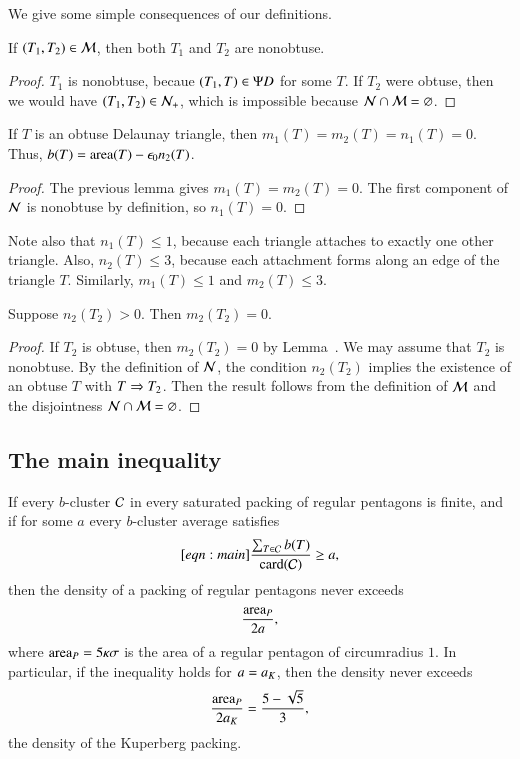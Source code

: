 We give  some simple consequences of our definitions.

\begin{lemma} If $(T_1,T_2)\in \mathcal M$, then both $T_1$ and $T_2$ are nonobtuse.
\end{lemma}

\begin{proof}  $T_1$ is nonobtuse, becaue $(T_1,T)\in\Psi D$ for some $T$.
If $T_2$ were obtuse, then we would have $(T_1,T_2)\in \mathcal N_+$, which is impossible
because $\mathcal N\cap \mathcal M = \varnothing$.
\end{proof}

\begin{lemma}[obtuse $b$]  If $T$ is an obtuse Delaunay triangle, then $m_1(T)=m_2(T)=n_1(T)=0$.
Thus, $b(T) = {\operatorname{area}}(T) - \epsilon_0 n_2(T)$.
\end{lemma}

\begin{proof}  The previous lemma gives $m_1(T)=m_2(T)=0$.  The first component of
$\mathcal N$ is nonobtuse by definition, so $n_1(T)=0$.
\end{proof}

\begin{remark}
  Note also that $n_1(T)\le 1$, because each triangle attaches to
  exactly one other triangle.  Also, $n_2(T)\le 3$, because each
  attachment forms along an edge of the triangle $T$.  Similarly,
  $m_1(T)\le 1$ and $m_2(T)\le 3$.
\end{remark}

\begin{lemma}\label{lemma:n2m2}  Suppose $n_2(T_2)>0$.  Then $m_2(T_2)=0$.
\end{lemma}

\begin{proof} If $T_2$ is obtuse, then $m_2(T_2)=0$ by Lemma~.
We may assume that $T_2$ is nonobtuse.
By the definition of $\mathcal N$, the condition $n_2(T_2)$ implies the existence of an obtuse $T$ with $T\Rightarrow T_2$.
Then the result follows from the definition of $\mathcal M$ and the disjointness $\mathcal N\cap\mathcal M = \varnothing$.
\end{proof}



\subsection{The main inequality}

\begin{lemma}  
If  every $b$-cluster $\mathcal C$ in every saturated packing of regular
  pentagons is finite, and if for some $a$ every $b$-cluster average
  satisfies
\begin{equation}\libel{eqn:main}
\frac{\sum_{T\in \C} b(T)}{\card(\C)} \ge a,
\end{equation}
then the density of a packing of regular pentagons never exceeds 
\[
\frac{{\operatorname{area}}_P} {2 a},
\]
where ${\operatorname{area}}_P = 5\kappa\sigma$ is the area of a regular pentagon of
circumradius $1$.  In particular, if the inequality holds for $a=a_K$,
then the density never exceeds
\[
\frac{{\operatorname{area}}_P}{2 a_K} = \frac{5 - \sqrt{5}}{3},
\] %
the density of the Kuperberg packing.
\end{lemma}

